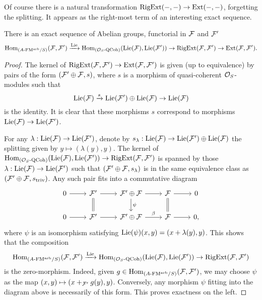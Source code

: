 \documentclass[../main.tex]{subfiles}
\begin{document}
Of course there is a natural transformation $\operatorname {RigExt}(-,-) \to \operatorname{Ext}(-,-)$,
forgetting the splitting. It appears as the right-most
term of an interesting exact sequence.
\begin{prop}\label{prop:InterestingES}
  There is an exact sequence of Abelian groups, functorial in
  $\mathcal{F}$ and $\mathcal{F}'$
  \begin{equation*}
    \operatorname{Hom}_{{({A}\text-\allowbreak\mathrm{FM^{arb}}/{S})}}(\mathcal{F}, \mathcal{F}') \xrightarrow{\operatorname{Lie}} \operatorname{Hom}_{{({\mathcal{O}_S}\text-\allowbreak\mathrm{QCoh})}}(\operatorname{Lie}(\mathcal{F}), \operatorname{Lie}(\mathcal{F}'))
    \to \operatorname {RigExt}(\mathcal{F}, \mathcal{F}') \to \operatorname{Ext}(\mathcal{F}, \mathcal{F}'). 
  \end{equation*}
\begin{proof}
  The kernel of $\operatorname {RigExt}(\mathcal{F},\mathcal{F}') \to \operatorname{Ext}(\mathcal{F},\mathcal{F}')$ is given (up to
  equivalence) by 
  pairs of the form $(\mathcal{F}' \oplus \mathcal{F}, s)$, where $s$ is a morphism
  of quasi-coherent $\mathcal{O}_S$-modules such that 
  $$ \operatorname{Lie}(\mathcal{F}) \xrightarrow{s} \operatorname{Lie}(\mathcal{F}') \oplus \operatorname{Lie}(\mathcal{F}) \to  \operatorname{Lie}(\mathcal{F})$$
  is the identity. It is clear that these morphisms $s$ correspond to morphisms 
  $\operatorname{Lie}(\mathcal{F}) \to \operatorname{Lie}(\mathcal{F}')$. 

  For any $\lambda: \operatorname{Lie}(\mathcal{F}) \to \operatorname{Lie}(\mathcal{F}')$, denote by $s_\lambda : 
  \operatorname{Lie}(\mathcal{F}) \to \operatorname{Lie}(\mathcal{F}') \oplus \operatorname{Lie}(\mathcal{F})$ the splitting given by 
  $y \mapsto (\lambda(y) , y)$.
  The kernel of $\operatorname{Hom}_{{({\mathcal{O}_S}\text-\allowbreak\mathrm{QCoh})}}(\operatorname{Lie}(\mathcal{F}), \operatorname{Lie}(\mathcal{F}')) \to \operatorname {RigExt}(\mathcal{F},
  \mathcal{F}')$ is spanned by those $\lambda: \operatorname{Lie}(\mathcal{F}) \to \operatorname{Lie}(\mathcal{F}')$ such that 
  $(\mathcal{F}' \oplus \mathcal{F}, s_\lambda)$ is in the same equivalence
  class as $(\mathcal{F}' \oplus \mathcal{F}, s_{\mathrm{triv}})$. Any such pair fits into
  a commutative diagram 
  \begin{equation*}
    \begin{tikzcd}[ampersand replacement=\&]
    	0 \& {\cF'} \& {\cF' \oplus \cF} \& \cF \& 0 \\
    	0 \& {\cF'} \& {\cF' \oplus \cF} \& \cF \& 0,
    	\arrow[from=1-1, to=1-2]
    	\arrow[from=1-2, to=1-3]
    	\arrow[Rightarrow, no head, from=1-2, to=2-2]
    	\arrow[from=1-3, to=1-4]
    	\arrow["\psi", from=1-3, to=2-3]
    	\arrow[from=1-4, to=1-5]
    	\arrow[Rightarrow, no head, from=1-4, to=2-4]
    	\arrow[from=2-1, to=2-2]
    	\arrow[ from=2-2, to=2-3]
    	\arrow["\beta", from=2-3, to=2-4]
    	\arrow[from=2-4, to=2-5]
    \end{tikzcd}
  \end{equation*}
  where $\psi$ is an isomorphism satisfying $\operatorname{Lie}(\psi)(x,y) = (x + \lambda(y), y)$.
  This shows that the composition 
  \begin{equation*}
    \operatorname{Hom}_{{({A}\text-\allowbreak\mathrm{FM^{arb}}/{S})}}(\mathcal{F}, \mathcal{F}') \xrightarrow{\operatorname{Lie}} \operatorname{Hom}_{{({\mathcal{O}_S}\text-\allowbreak\mathrm{QCoh})}}(\operatorname{Lie}(\mathcal{F}),
    \operatorname{Lie}(\mathcal{F}')) \to \operatorname {RigExt}(\mathcal{F}, \mathcal{F}')
  \end{equation*}
  is the zero-morphism. Indeed, given $g \in  \operatorname{Hom}_{{({A}\text-\allowbreak\mathrm{FM^{arb}}/{S})}}(\mathcal{F}, \mathcal{F}')$,
  we may choose $\psi$ as the map $(x, y) \mapsto (x +_{\mathcal{F}'} g(y), y)$.
  Conversely, any morphism $\psi$ fitting into the diagram above is necessarily
  of this form. This proves exactness on the left.
\end{proof}
\end{prop}

\end{document}
